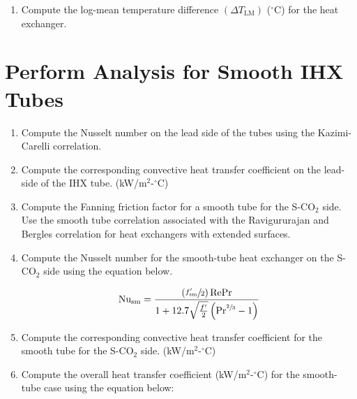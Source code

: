 \begin{fullwidth}
\begin{enumerate}
\item Compute the log-mean temperature difference $\left(\Delta T_{\text{LM}} \right)$ ($^{\circ}$C) for the heat exchanger.

\end{enumerate}

\section{Perform Analysis for Smooth IHX Tubes}

\begin{enumerate}[resume]
\item Compute the Nusselt number on the lead side of the tubes using the Kazimi-Carelli correlation.

\vspace{1.0 cm}

\item Compute the corresponding convective heat transfer coefficient on the lead-side of the IHX tube. (kW/m$^2$-$^{\circ}$C)

\vspace{1.0 cm}

\item Compute the Fanning friction factor for a smooth tube for the S-CO$_2$ side.  Use the smooth tube correlation associated with the Ravigururajan and Bergles correlation for heat exchangers with extended surfaces.

\vspace{1.0 cm}

\item Compute the Nusselt number for the smooth-tube heat exchanger on the S-CO$_2$ side using the equation below.

$$ \text{Nu}_{\text{sm}} = \frac{\left(\sfrac{f^{\prime}_{\text{sm}}}{2} \right)\text{RePr}}{1 + 12.7 \sqrt{\frac{f^{\prime}}{2}} \left(\text{Pr}^{\sfrac{2}{3}}-1 \right) }$$


\vspace{1.0 cm}

\item Compute the corresponding convective heat transfer coefficient for the smooth tube for the S-CO$_2$ side. (kW/m$^2$-$^{\circ}$C)

\vspace{1.0 cm}

\item Compute the overall heat transfer coefficient (kW/m$^2$-$^{\circ}$C) for the smooth-tube case using the equation below:


\end{enumerate}
\end{fullwidth}
